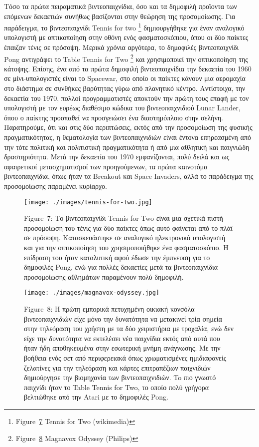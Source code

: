 \documentclass[
]{article}
\begin{document}
Τόσο τα πρώτα πειραματικά βιντεοπαιχνίδια, όσο και τα δημοφιλή προϊοντα
των επόμενων δεκαετιών συνήθως βασίζονται στην θεώρηση της προσομοίωσης.
Για παράδειγμα, το βιντεοπαιχνίδι Tennis for two \footnote{Figure~\protect\hyperlink{fig:tennis-for-two}{7}
  Tennis for Two (wikimedia)} δημιουργήθηκε για έναν αναλογικό
υπολογιστή με οπτικοποίηση στην οθόνη ενός φασματοσκόπιου, όπου οι δύο
παίκτες έπαιζαν τένις σε πρόσοψη. Μερικά χρόνια αργότερα, το δημοφιλές
βιντεοπαιχνίδι Pong αντιγράφει το Table Tennis for Two \footnote{Figure~\protect\hyperlink{fig:magnavox-odyssey}{8}
  Magnavox Odyssey (Philips)} και χρησιμοποιεί την οπτικοποίηση της
κάτοψης. Επίσης, ένα από τα πρώτα δημοφιλή βιντεοπαιχνίδια την δεκαετία
του 1960 σε μίνι-υπολογιστές είναι το Spacewar, στο οποίο οι παίκτες
κάνουν μια αερομαχία στο διάστημα σε συνθήκες βαρύτητας γύρω από
πλανητικό κέντρο. Αντίστοιχα, την δεκαετία του 1970, πολλοί
προγραμματιστές αποκτούν την πρώτη τους επαφή με τον υπολογιστή με τον
ευρέως διαθέσιμο κώδικα του βιντεοπαιχνιδιού Lunar Lander, όπου ο
παίκτης προσπαθεί να προσγειώσει ένα διαστημόπλοιο στην σελήνη.
Παρατηρούμε, ότι και στις δύο περιπτώσεις, εκτός από την προσομοίωση της
φυσικής πραγματικότητας, η θεματολογία των βιντεοπαιχνιδιών είναι έντονα
επηρεασμένη από την τότε πολιτική και πολιτιστική πραγματικότητα ή από
μια αθλητική και παιγνιώδη δραστηριότητα. Μετά την δεκαετία του 1970
εμφανίζονται, πολύ δειλά και ως αφαιρετικοί μετασχηματισμοί των
προηγούμενων, τα πρώτα καινοτόμα βιντεοπαιχνίδια, όπως ήταν τα Breakout
και Space Invaders, αλλά το παράδειγμα της προσομοίωσης παραμένει
κυρίαρχο.

\leavevmode{}%
\begin{figure}
\hypertarget{fig:tennis-for-two}{%
\centering
\texttt{[image: ./images/tennis-for-two.jpg]}
\caption{Figure~7: Το βιντεοπαιχνίδι Tennis for Two είναι μια σχετικά
πιστή προσομοίωση του τένις για δύο παίκτες όπως αυτό φαίνεται από το
πλάϊ σε πρόσοψη. Κατασκευάστηκε σε αναλογικό ηλεκτρονικό υπολογιστή και
για την οπτικοποίηση του χρησιμοποιήθηκε ένα φασματοσκόπιο. Η επίδραση
του ήταν καταλυτική αφού έδωσε την έμπνευση για το δημοφιλές Pong, ενώ
για πολλές δεκαετίες μετά τα βιντεοπαιχνίδια προσομοίωσης αθλημάτων
παραμένουν πολύ δημοφιλή.}\label{fig:tennis-for-two}
}
\end{figure}

\leavevmode{}%
\begin{figure}
\hypertarget{fig:magnavox-odyssey}{%
\centering
\texttt{[image: ./images/magnavox-odyssey.jpg]}
\caption{Figure~8: Η πρώτη εμπορικά πετυχημένη οικιακή κονσόλα
βιντεοπαιχνιδιών είχε μόνο την δυνατότητα να μετακινεί τρία σημεία στην
τηλεόραση του χρήστη με τα δύο χειριστήρια με τροχαλία, ενώ δεν είχε την
δυνατότητα να εκτελέσει νέα παιχνίδια εκτός από αυτά που ήταν ήδη
αποθηκευμένα στην εσωτερική μνήμη ανάγνωσης. Με την βοήθεια ενός σετ από
περιφερειακά όπως χρωματισμένες ημιδιαφανείς ζελατίνες για την τηλεόραση
και κάρτες επιτραπέζιων παιχνιδιών δημιούργησε την βιομηχανία των
βιντεοπαιχνιδιών. To πιο γνωστό παιχνίδι ήταν το Table Tennis for Two,
το οποίο πολύ γρήγορα βελτιώθηκε από την Atari με το δημοφιλές
Pong.}\label{fig:magnavox-odyssey}
}
\end{figure}
\end{document}
